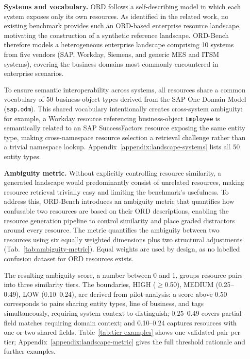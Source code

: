 \documentclass[10pt,twocolumn]{article}
\begin{document}
\textbf{Systems and vocabulary.} ORD follows a self-describing model in which each system exposes only its own resources. As identified in the related work, no existing benchmark provides such an ORD-based enterprise resource landscape, motivating the construction of a synthetic reference landscape. ORD-Bench therefore models a heterogeneous enterprise landscape comprising 10 systems from five vendors (SAP, Workday, Siemens, and generic MES and ITSM systems), covering the business domains most commonly encountered in enterprise scenarios. 

To ensure semantic interoperability across systems, all resources share a common vocabulary of 50 business-object types derived from the SAP One Domain Model (\texttt{sap.odm}). This shared vocabulary intentionally creates cross-system ambiguity: for example, a Workday resource referencing business-object \texttt{Employee} is semantically related to an SAP SuccessFactors resource exposing the same entity type, making cross-namespace resource selection a retrieval challenge rather than a trivial namespace lookup. Appendix~\ref{appendix:landscape-systems} lists all 50 entity types.


\textbf{Ambiguity metric.} Without explicitly controlling resource similarity, a generated landscape would predominantly consist of unrelated resources, making resource retrieval trivially easy and limiting the benchmark's usefulness. To address this, ORD-Bench introduces an ambiguity metric that quantifies how confusable two resources are based on their ORD descriptions, enabling the resource generation pipeline to control similarity and place graded distractors around every resource. The metric quantifies the ambiguity between two resources using six equally weighted dimensions plus two structural adjustments (Tab.~\ref{tab:ambiguity-metric}). Equal weights are used by design, as no labelled confusion dataset for ORD resources exists. 

The resulting ambiguity score, a number between 0 and 1, groups resource pairs into three similarity tiers. The boundaries, HIGH ($\geq$0.50), MEDIUM (0.25--0.49), LOW (0.10--0.24), are derived from pilot analysis: a score above 0.50 corresponds to pairs sharing entity types, line of business, and tags simultaneously, requiring system-context to distinguish; 0.25--0.49 covers partial-field matches requiring domain context; and 0.10--0.24 captures resources with one or two shared fields. Table~\ref{tab:tier-examples} shows one validated pair per tier; Appendix~\ref{appendix:landscape-metric} gives the full threshold rationale and further examples.
\end{document}
